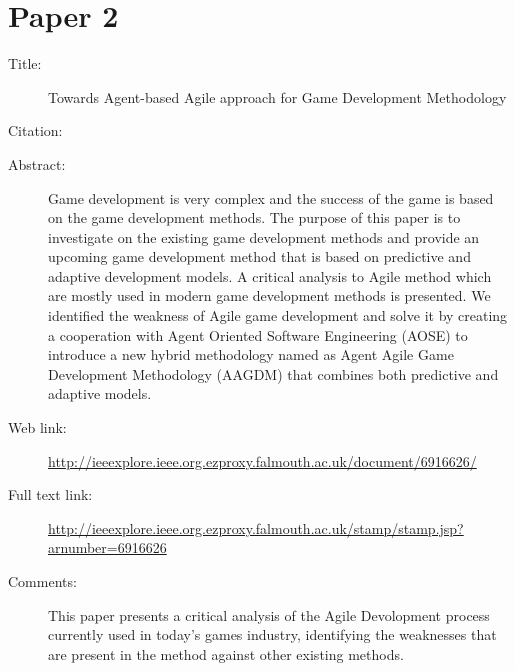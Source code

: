 \documentclass{scrartcl}
\begin{document}
\section*{Paper 2}
\begin{description}
\item[Title:] Towards Agent-based Agile approach for Game Development Methodology
\item[Citation:] \cite{al2014towards}
\item[Abstract:] Game development is very complex and the success of the game is based on the game development methods. The purpose of this paper is to investigate on the existing game development methods and provide an upcoming game development method that is based on predictive and adaptive development models. A critical analysis to Agile method which are mostly used in modern game development methods is presented. We identified the weakness of Agile game development and solve it by creating a cooperation with Agent Oriented Software Engineering (AOSE) to introduce a new hybrid methodology named as Agent Agile Game Development Methodology (AAGDM) that combines both predictive and adaptive models.
\item[Web link:] \url{http://ieeexplore.ieee.org.ezproxy.falmouth.ac.uk/document/6916626/}
\item[Full text link:] \url{http://ieeexplore.ieee.org.ezproxy.falmouth.ac.uk/stamp/stamp.jsp?arnumber=6916626}
\item[Comments:] This paper presents a critical analysis of the Agile Devolopment process currently used in today's games industry, identifying the weaknesses that are present in the method against other existing methods.
\end{description}
\end{document}
